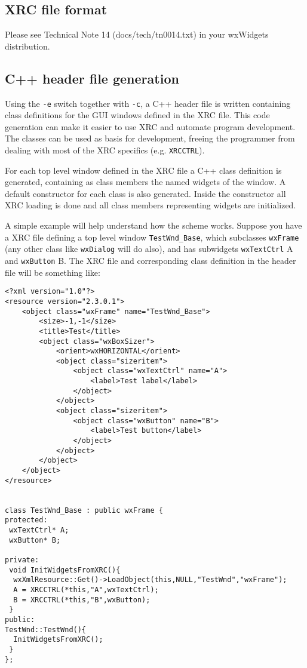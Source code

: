 \subsection{XRC file format}\label{xrcfileformat}

Please see Technical Note 14 (docs/tech/tn0014.txt) in your wxWidgets
distribution.

\subsection{C++ header file generation}\label{xrccppheader}

Using the {\tt -e} switch together with {\tt -c}, a C++ header file is written
containing class definitions for the GUI windows defined in the XRC file.
This code generation can make it easier to use XRC and automate program
development.
The classes can be used as basis for development, freeing the
programmer from dealing with most of the XRC specifics (e.g. {\tt XRCCTRL}).

For each top level window defined in the XRC file a C++ class definition is
generated, containing as class members the named widgets of the window.
A default constructor for each class is also generated. Inside the constructor 
all XRC loading is done and all class members representing widgets are initialized. 

A simple example will help understand how the scheme works. Suppose you have
a XRC file defining a top level window {\tt TestWnd\_Base}, which subclasses {\tt wxFrame} (any 
other class like {\tt wxDialog} will do also), and has subwidgets {\tt wxTextCtrl} A and {\tt wxButton} B.
The XRC file and corresponding class definition in the header file will be something like:

\begin{verbatim}
<?xml version="1.0"?>
<resource version="2.3.0.1">
    <object class="wxFrame" name="TestWnd_Base">
        <size>-1,-1</size>
        <title>Test</title>
        <object class="wxBoxSizer">
            <orient>wxHORIZONTAL</orient>
            <object class="sizeritem">
                <object class="wxTextCtrl" name="A">
                    <label>Test label</label>
                </object>
            </object>
            <object class="sizeritem">
                <object class="wxButton" name="B">
                    <label>Test button</label>
                </object>
            </object>
        </object>
    </object>
</resource>


class TestWnd_Base : public wxFrame {
protected:
 wxTextCtrl* A;
 wxButton* B;

private:
 void InitWidgetsFromXRC(){
  wxXmlResource::Get()->LoadObject(this,NULL,"TestWnd","wxFrame");
  A = XRCCTRL(*this,"A",wxTextCtrl);
  B = XRCCTRL(*this,"B",wxButton);
 }
public:
TestWnd::TestWnd(){
  InitWidgetsFromXRC();
 }
};
\end{verbatim}

